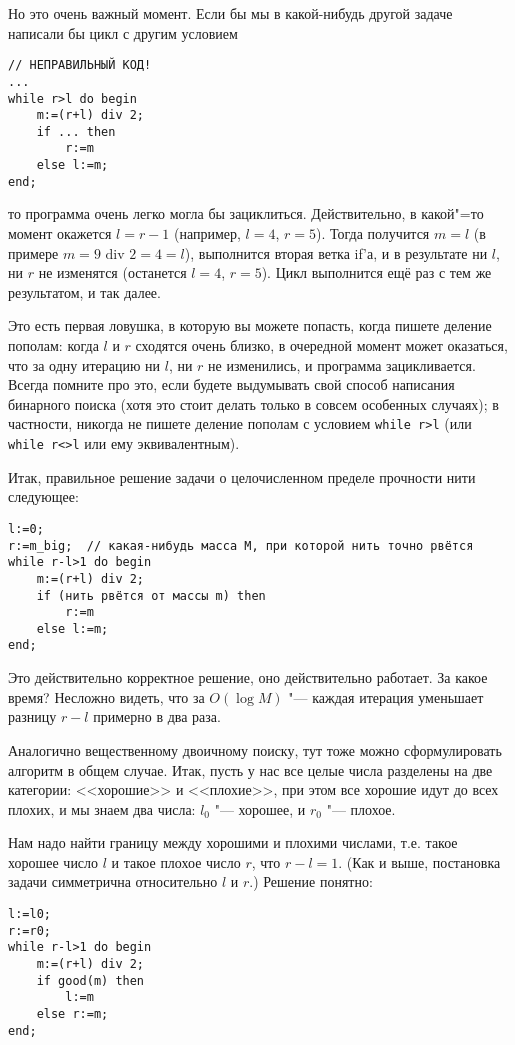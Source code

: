 Но это очень важный момент. Если бы мы в какой-нибудь другой задаче написали бы цикл с другим условием
\begin{codesampleo}\begin{verbatim}
// НЕПРАВИЛЬНЫЙ КОД!
...
while r>l do begin    
    m:=(r+l) div 2;
    if ... then
        r:=m
    else l:=m;
end;
\end{verbatim}
\end{codesampleo}
то программа очень легко могла бы зациклиться. Действительно, в какой"=то момент окажется $l=r-1$ (например, $l=4$, $r=5$).
Тогда получится $m=l$ (в примере $m=9\mbox{ div } 2=4=l$), выполнится вторая ветка if'а, и в результате ни $l$, ни $r$ не изменятся
(останется $l=4$, $r=5$). Цикл выполнится ещё раз с тем же результатом, и так далее.

Это есть первая ловушка, в которую вы можете попасть, когда пишете деление пополам: когда $l$ и $r$ сходятся очень близко, 
в очередной момент может оказаться, что за одну итерацию ни $l$, ни $r$ не изменились, и программа зацикливается.
Всегда помните про это, если будете выдумывать свой способ написания бинарного поиска (хотя это стоит делать только в совсем особенных случаях);
в частности, никогда не пишете деление пополам с условием \verb`while r>l` (или \verb`while r<>l` или ему эквивалентным).

Итак, правильное решение задачи о целочисленном пределе прочности нити следующее:
\begin{codesampleo}\begin{verbatim}
l:=0;
r:=m_big;  // какая-нибудь масса M, при которой нить точно рвётся
while r-l>1 do begin    
    m:=(r+l) div 2;
    if (нить рвётся от массы m) then
        r:=m
    else l:=m;
end;
\end{verbatim}
\end{codesampleo}

Это действительно корректное решение, оно действительно работает. За какое время? 
Несложно видеть, что за $O(\log M)$ "--- каждая итерация уменьшает разницу $r-l$ примерно в два раза.

 Аналогично вещественному двоичному поиску, тут тоже можно сформулировать алгоритм в общем случае.
Итак, пусть у нас все целые числа разделены на две категории: <<хорошие>> и <<плохие>>, при этом все хорошие идут до всех плохих,
и мы знаем два числа: $l_0$ "--- хорошее, и $r_0$ "--- плохое. 

Нам надо найти границу между хорошими и плохими числами, т.е. такое хорошее число $l$ и такое плохое число $r$, что $r-l=1$. 
(Как и выше, постановка задачи симметрична относительно $l$ и $r$.)
Решение понятно:
\begin{codesampleo}\begin{verbatim}
l:=l0;
r:=r0;  
while r-l>1 do begin    
    m:=(r+l) div 2;
    if good(m) then
        l:=m
    else r:=m;
end;
\end{verbatim}
\end{codesampleo}

